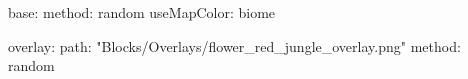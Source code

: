 base:
  method: random
  useMapColor: biome
  
overlay:
  path: "Blocks/Overlays/flower_red_jungle_overlay.png"
  method: random